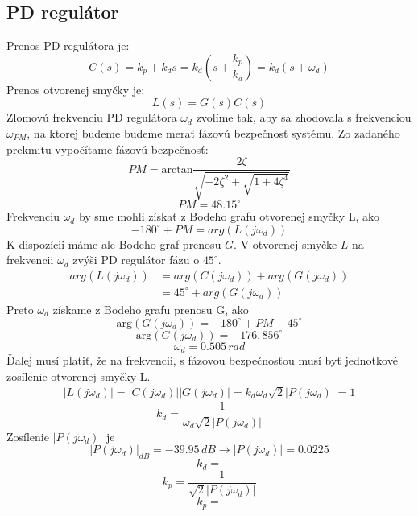 \documentclass[journal]{IEEEtran}
\begin{document}
\subsection{PD regulátor}
Prenos PD regulátora je:
\begin{equation}
	C(s)=k_p + k_ds=k_d\left(s+\frac{k_p}{k_d}\right)=k_d(s+\omega_d)
\end{equation}
Prenos otvorenej smyčky je:
\begin{equation}
L(s)=G(s)C(s)
\end{equation}
Zlomovú frekvenciu PD regulátora $\omega_d$ zvolíme tak, aby sa zhodovala s frekvenciou $\omega_{PM}$, na ktorej budeme budeme merať fázovú bezpečnosť systému. Zo zadaného prekmitu vypočítame fázovú bezpečnosť:
\begin{equation} \label{eq:2}
PM=\mathrm{arctan}\frac{2\zeta}{\sqrt{-2\zeta^2+\sqrt{1+4\zeta^4}}}
\end{equation}
\begin{equation}
PM=48.15^\circ
\end{equation}
Frekvenciu $\omega_d$ by sme mohli získať z Bodeho grafu otvorenej smyčky L, ako
\begin{equation}
-180^\circ+PM=arg(L(j \omega_d))
\end{equation}
K dispozícii máme ale Bodeho graf prenosu $G$. V otvorenej smyčke $L$ na frekvencii $\omega_d$ zvýši PD regulátor fázu o $45^\circ$.
\begin{align}
arg(L(j\omega_d))&=arg(C(j\omega_d))+arg(G(j\omega_d))\nonumber\\
&=45^\circ+arg(G(j\omega_d))
\end{align}
 Preto $\omega_d$ získame z Bodeho grafu prenosu G, ako
\begin{equation}
\mathrm{arg}(G(j\omega_d))=-180^\circ + PM -45^\circ
\end{equation} 
\begin{equation}
\mathrm{arg}(G(j\omega_d))=-176,856^\circ
\end{equation} 
\begin{equation}
\omega_d = 0.505\, rad
\end{equation} 
Ďalej musí platiť, že na frekvencii, s fázovou bezpečnosťou musí byť jednotkové zosílenie otvorenej smyčky L.
\begin{align}
|L(j\omega_d)|=|C(j\omega_d)||G(j\omega_d)|\nonumber=k_d\omega_d\sqrt{2}|P(j\omega_d)|=1
\end{align} 
\begin{equation}
k_d=\frac{1}{\omega_d\sqrt{2}|P(j\omega_d)|}
\end{equation}
Zosílenie $|P(j\omega_d)|$ je
\begin{equation}
 |P(j\omega_d)|_{dB}=-39.95\,dB \rightarrow |P(j\omega_d)|=0.0225 
\end{equation}
\begin{equation}
k_d=
\end{equation}
\begin{equation}
k_p=\frac{1}{\sqrt{2}|P(j\omega_d)|}
\end{equation}
\begin{equation}
k_p=
\end{equation}
\end{document}
